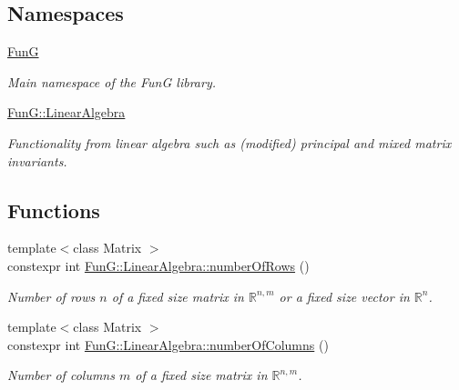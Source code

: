 \subsection*{Namespaces}
\begin{DoxyCompactItemize}
\item 
 \hyperlink{namespaceFunG}{Fun\+G}
\begin{DoxyCompactList}\small\item\em Main namespace of the Fun\+G library. \end{DoxyCompactList}\item 
 \hyperlink{namespaceFunG_1_1LinearAlgebra}{Fun\+G\+::\+Linear\+Algebra}
\begin{DoxyCompactList}\small\item\em Functionality from linear algebra such as (modified) principal and mixed matrix invariants. \end{DoxyCompactList}\end{DoxyCompactItemize}
\subsection*{Functions}
\begin{DoxyCompactItemize}
\item 
{\footnotesize template$<$class Matrix $>$ }\\constexpr int \hyperlink{namespaceFunG_1_1LinearAlgebra_ac1ff54cc5554748b5a9585c09745f139}{Fun\+G\+::\+Linear\+Algebra\+::number\+Of\+Rows} ()
\begin{DoxyCompactList}\small\item\em Number of rows $n$ of a fixed size matrix in $\mathbb{R}^{n,m}$ or a fixed size vector in $\mathbb{R}^n$. \end{DoxyCompactList}\item 
{\footnotesize template$<$class Matrix $>$ }\\constexpr int \hyperlink{namespaceFunG_1_1LinearAlgebra_a4ed2c140b262ec0c33c93af62d65d1b1}{Fun\+G\+::\+Linear\+Algebra\+::number\+Of\+Columns} ()
\begin{DoxyCompactList}\small\item\em Number of columns $m$ of a fixed size matrix in $\mathbb{R}^{n,m}$. \end{DoxyCompactList}\end{DoxyCompactItemize}
